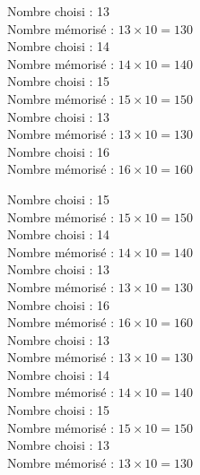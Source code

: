 \documentclass[a4paper,11pt,fleqn]{article}
\begin{document}
\bigskip
Nombre choisi : 13 \\
Nombre mémorisé : $13\times10=130$ \\

\bigskip
Nombre choisi : 14 \\
Nombre mémorisé : $14\times10=140$ \\

\bigskip
Nombre choisi : 15 \\
Nombre mémorisé : $15\times10=150$ \\

\bigskip
Nombre choisi : 13 \\
Nombre mémorisé : $13\times10=130$ \\

\bigskip
Nombre choisi : 16 \\
Nombre mémorisé : $16\times10=160$ \\

\bigskip

\newpage
\setcounter{exo}{0}
\setcounter{section}{0}

Nombre choisi : 15 \\
Nombre mémorisé : $15\times10=150$ \\

\bigskip
Nombre choisi : 14 \\
Nombre mémorisé : $14\times10=140$ \\

\bigskip
Nombre choisi : 13 \\
Nombre mémorisé : $13\times10=130$ \\

\bigskip
Nombre choisi : 16 \\
Nombre mémorisé : $16\times10=160$ \\

\bigskip
Nombre choisi : 13 \\
Nombre mémorisé : $13\times10=130$ \\

\bigskip
Nombre choisi : 14 \\
Nombre mémorisé : $14\times10=140$ \\

\bigskip
Nombre choisi : 15 \\
Nombre mémorisé : $15\times10=150$ \\

\bigskip
Nombre choisi : 13 \\
Nombre mémorisé : $13\times10=130$ \\
\end{document}
